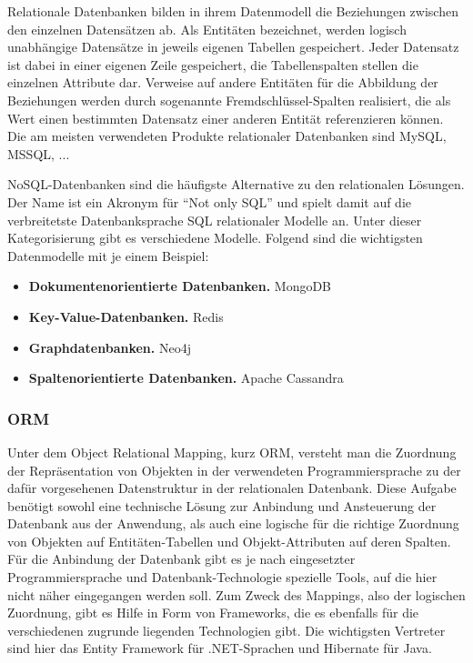 Relationale Datenbanken bilden in ihrem Datenmodell die Beziehungen zwischen den einzelnen Datensätzen ab.
Als Entitäten bezeichnet, werden logisch unabhängige Datensätze in jeweils eigenen Tabellen gespeichert. Jeder Datensatz ist dabei in einer eigenen Zeile gespeichert, die Tabellenspalten stellen die einzelnen Attribute dar.
Verweise auf andere Entitäten für die Abbildung der Beziehungen werden durch sogenannte Fremdschlüssel-Spalten realisiert, die als Wert einen bestimmten Datensatz einer anderen Entität referenzieren können.
Die am meisten verwendeten Produkte relationaler Datenbanken sind MySQL, MSSQL, ...%

\acs{NoSQL}-Datenbanken sind die häufigste Alternative zu den relationalen Lösungen. Der Name ist ein Akronym für \enquote{Not only SQL} und spielt damit auf die verbreitetste Datenbanksprache \acs{SQL} relationaler Modelle an.
Unter dieser Kategorisierung gibt es verschiedene Modelle. Folgend sind die wichtigsten Datenmodelle mit je einem Beispiel:

\begin{itemize}
\item\textbf{Dokumentenorientierte Datenbanken.} MongoDB
\item\textbf{Key-Value-Datenbanken.} Redis
\item\textbf{Graphdatenbanken.} Neo4j
\item\textbf{Spaltenorientierte Datenbanken.} Apache Cassandra
\end{itemize}

\subsubsection{ORM}
Unter dem Object Relational Mapping, kurz \acs{ORM}, versteht man die Zuordnung der Repräsentation von Objekten in der verwendeten Programmiersprache zu der dafür vorgesehenen Datenstruktur in der relationalen Datenbank.
Diese Aufgabe benötigt sowohl eine technische Lösung zur Anbindung und Ansteuerung der Datenbank aus der Anwendung, als auch eine logische für die richtige Zuordnung von Objekten auf Entitäten-Tabellen und Objekt-Attributen auf deren Spalten.
Für die Anbindung der Datenbank gibt es je nach eingesetzter Programmiersprache und Datenbank-Technologie spezielle Tools, auf die hier nicht näher eingegangen werden soll.
Zum Zweck des Mappings, also der logischen Zuordnung, gibt es Hilfe in Form von Frameworks, die es ebenfalls für die verschiedenen zugrunde liegenden Technologien gibt.
Die wichtigsten Vertreter sind hier das Entity Framework für .NET-Sprachen und Hibernate für Java.

